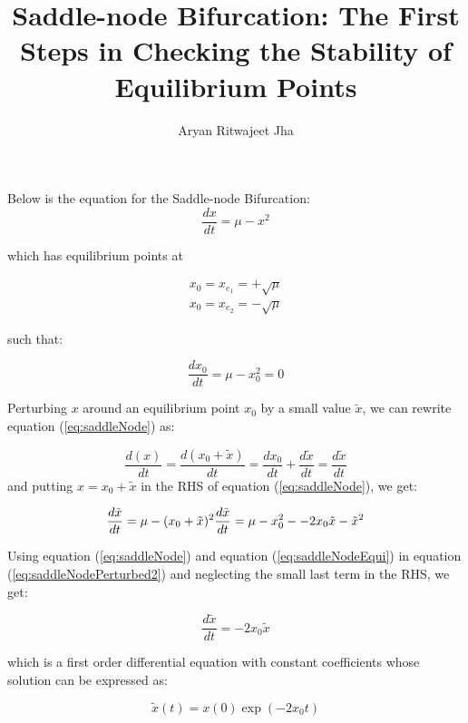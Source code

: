 \documentclass{article}
\begin{document}
	\title{Saddle-node Bifurcation: The First Steps in Checking the Stability of Equilibrium Points}
	\author{Aryan Ritwajeet Jha}
	\maketitle
	
Below is the equation for the Saddle-node Bifurcation: 
	\begin{equation}
		\label{eq:saddleNode}
		\frac{dx}{dt} = \mu - x^2
	\end{equation}
	
which has equilibrium points at
	
	\begin{align*}
		x_0 = x_{e_1} = +\sqrt\mu \\
		x_0 = x_{e_2} = -\sqrt\mu
	\end{align*} 

such that:
	
	\begin{equation}
		\label{eq:saddleNodeEqui}
		\frac{dx_0}{dt} = \mu - x_0^2 = 0 
	\end{equation}
	
	
Perturbing $x$ around an equilibrium point $x_0$ by a small value $\tilde x$, we can rewrite equation (\ref{eq:saddleNode}) as:
	
	\begin{equation}
		\label{eq:saddleNodePerturbed}
		\frac{d(x)}{dt} = \frac{d(x_0 + \tilde x)}{dt} =\frac{dx_0}{dt} + \frac{d \tilde x}{dt} = \frac{d \tilde x}{dt} 
	\end{equation}
and putting $x = x_0 + \tilde x$ in the RHS of equation (\ref{eq:saddleNode}), we get:
	
	\begin{equation}
		\label{eq:saddleNodePerturbed2}
		\frac{d\tilde x}{dt} = \mu - (x_0+\tilde x)^2 \\
		\frac{d\tilde x}{dt} = \mu - x_0^2 - -2x_0\tilde x - \tilde x^2
	\end{equation}
	
Using equation (\ref{eq:saddleNode}) and equation (\ref{eq:saddleNodeEqui}) in equation (\ref{eq:saddleNodePerturbed2}) and neglecting the small last term in the RHS, we get:
	
	\begin{equation}
		\frac{d\tilde x}{dt} = -2x_0\tilde x
	\end{equation}

which is a first order differential equation with constant coefficients whose solution can be expressed as:

	\begin{equation}
		\tilde{x}(t) = x(0)\exp{(-2x_0t)} 
	\end{equation}
\end{document}
